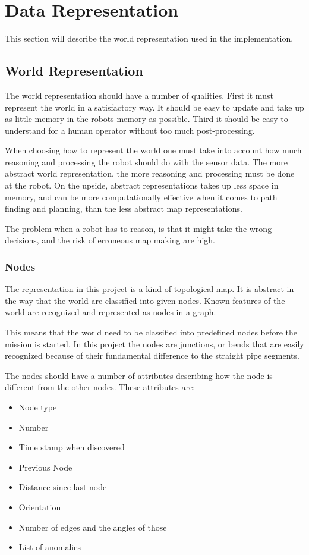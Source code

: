 

\chapter{Data Representation}
\label{chap5}
This section will describe the world representation used in the implementation.

\section{World Representation}
The world representation should have a number of qualities. First it must represent the
world in a satisfactory way. It should be easy to update and take up as little memory in
the robots memory as possible. Third it should be easy to understand for a human operator
without too much post-processing. 

When choosing how to represent the world one must take into account how much reasoning and
processing the robot should do with the sensor data. The more abstract world
representation, the more reasoning and processing must be done at the robot. On the
upside, abstract representations takes up less space in memory, and can be more
computationally effective when it comes to path finding and planning, than the less
abstract map representations. 

The problem when a robot has to reason, is that it might take the wrong decisions, and the
risk of erroneous map making are high. 

\subsection{Nodes}
The representation in this project is a kind of topological map. It is abstract in the way
that the world are classified into given nodes. Known features of the world are recognized
and represented as nodes in a graph. 

This means that the world need to be classified into predefined nodes before the mission
is started. In this project the nodes are junctions, or bends that are easily recognized
because of their fundamental difference to the straight pipe segments. 

The nodes should have a number of attributes describing how the node is different from the
other nodes. These attributes are:
\begin{itemize}
    \item Node type
    \item Number
    \item Time stamp when discovered
    \item Previous Node
    \item Distance since last node
    \item Orientation
    \item Number of edges and the angles of those
    \item List of anomalies
\end{itemize}

